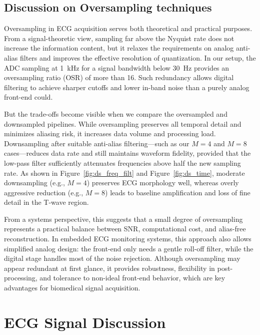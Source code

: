 \documentclass[10pt]{article}
\begin{document}
\subsection{Discussion on Oversampling techniques}

Oversampling in ECG acquisition serves both theoretical and practical purposes. From a signal-theoretic 
view, sampling far above the Nyquist rate does not increase the information content, but it relaxes the 
requirements on analog anti-alias filters and improves the effective resolution of quantization. In our setup, 
the ADC sampling at 1~kHz for a signal bandwidth below 30~Hz provides an oversampling ratio (OSR) of 
more than 16. Such redundancy allows digital filtering to achieve sharper cutoffs and lower in-band noise 
than a purely analog front-end could.

But the trade-offs become visible when we compare the oversampled and downsampled pipelines. 
While oversampling preserves all temporal detail and minimizes aliasing risk, it increases data volume and 
processing load. Downsampling after suitable anti-alias filtering---such as our $M=4$ and $M=8$ cases---reduces 
data rate and still maintains waveform fidelity, provided that the low-pass filter sufficiently attenuates 
frequencies above half the new sampling rate. As shown in Figure~\ref{fig:ds_freq_filt} and 
Figure~\ref{fig:ds_time}, moderate downsampling (e.g., $M=4$) preserves ECG morphology well, 
whereas overly aggressive reduction (e.g., $M=8$) leads to baseline amplification and loss of fine detail in 
the T-wave region.

From a systems perspective, this suggests that a small degree of oversampling represents 
a practical balance between SNR, computational cost, and alias-free reconstruction. In embedded ECG 
monitoring systems, this approach also allows simplified analog design: the front-end only needs a gentle 
roll-off filter, while the digital stage handles most of the noise rejection. Although oversampling may 
appear redundant at first glance, it provides robustness, flexibility in post-processing, and tolerance to 
non-ideal front-end behavior, which are key advantages for biomedical signal acquisition.


\section{ECG Signal Discussion }
\end{document}

